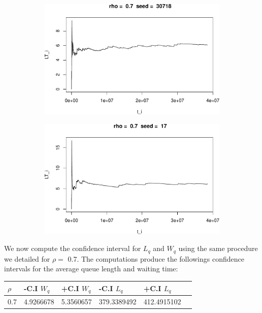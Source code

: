 \documentclass[]{article}
\begin{document}
\begin{figure}[h!]
\begin{subfigure}[b]{.55\linewidth}
\includegraphics[width=\linewidth]{003_files/figure-latex/unnamed-chunk-17-9.pdf}
\end{subfigure}\hfill
\begin{subfigure}[b]{.55\linewidth}
\includegraphics[width=\linewidth]{003_files/figure-latex/unnamed-chunk-17-10.pdf}
\end{subfigure}\vfill
\end{figure}



We now compute the confidence interval for \(L_{q}\) and \(W_{q}\) using
the same procedure we detailed for \(\rho =\) 0.7. The computations
produce the followings confidence intervals for the average queue length
and waiting time:

\begin{longtable}[]{@{}llllll@{}}
\toprule
\(\rho\) & -C.I \(W_{q}\) & +C.I \(W_{q}\) & -C.I \(L_{q}\) & +C.I
\(L_{q}\) &\tabularnewline
\midrule
\endhead
0.7 & 4.9266678 & 5.3560657 & 379.3389492 & 412.4915102\tabularnewline
\bottomrule
\end{longtable}
\end{document}
